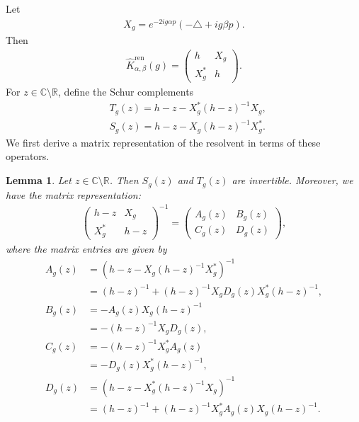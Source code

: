 \documentclass[12pt,dvipdfmx]{article}
\newtheorem{lemma}[theorem]{Lemma}
\newcommand{\RR}{\mathbb{R}}
\newcommand{\CC}{\mathbb{C}}
\begin{document}
Let \begin{align*}
    X_g = e^{-2ig\alpha p}(-\triangle + ig\beta p).
\end{align*}
Then
\begin{align*}
    \hat{K}^\mathrm{ren} _{\alpha,\beta}(g) 
    = 
    \begin{pmatrix}
        h & X_g\\
        X_g^\ast & h 
    \end{pmatrix}.
\end{align*}
For $z\in\CC\setminus\RR$, define the Schur complements
\begin{align*}
    &T_g(z) = h - z - X_g^\ast (h - z)^{-1} X_g,\\
    &S_g(z) = h - z - X_g (h - z)^{-1} X_g^\ast. 
    \end{align*}
We first derive a matrix representation of the resolvent in terms of these operators.
%
\begin{lemma}\label{lem:block_rep}
Let $z\in\CC\setminus\RR$. Then $S_g(z)$ and $T_g(z)$ are invertible. 
Moreover, we have the matrix representation: 
\begin{align}\label{block}
    \begin{pmatrix}
        h - z & X_g\\
        X_g^\ast & h - z
    \end{pmatrix}^{-1}
    =
    \begin{pmatrix}
        A_g(z) & B_g(z)\\
        C_g(z) & D_g(z)
    \end{pmatrix},
\end{align}
where the matrix entries are given by
\begin{align*}
    A_g(z) &= (h - z - X_g (h - z)^{-1} X_g^\ast)^{-1}
    \\
    &= (h - z)^{-1} + (h - z)^{-1} X_g D_g(z) X_g^\ast (h - z)^{-1},
    \\
    B_g(z) &= -A_g(z) X_g (h - z)^{-1}
    \\
    &= -(h - z)^{-1} X_g D_g(z),
    \\
    C_g(z) &= -(h - z)^{-1} X_g^\ast A_g(z)
    \\
    &= -D_g(z) X_g^\ast (h - z)^{-1},
    \\
    D_g(z) &= (h - z - X_g^\ast (h - z)^{-1} X_g)^{-1}
    \\
    &= (h - z)^{-1} + (h - z)^{-1} X_g^\ast A_g(z) X_g (h - z)^{-1}.
\end{align*}
\end{lemma}
%
\end{document}
